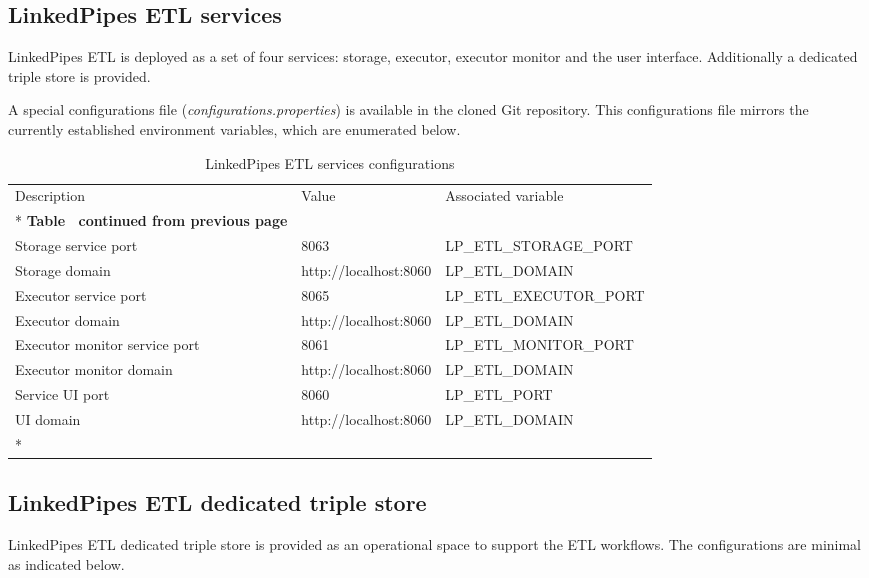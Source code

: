 	\subsection{LinkedPipes ETL services}
	
	LinkedPipes ETL is deployed as a set of four services: storage, executor, executor monitor and the user interface. Additionally a dedicated triple store is provided. 
	
	A special configurations file (\textit{configurations.properties}) is available in the cloned Git repository. This configurations file mirrors the currently established environment variables, which are enumerated below. 
	

	\begin{longtable}[c]{@{}p{5cm}p{4cm}l@{}}
		\toprule
		Description & Value & Associated variable \\* \midrule
		\endfirsthead
		\multicolumn{3}{c}%
		{{\bfseries Table \thetable\ continued from previous page}} \\
		\endhead
		\bottomrule
		\endfoot
		\endlastfoot
		Storage service port & 8063 & LP\_ETL\_STORAGE\_PORT \\
		Storage domain & http://localhost:8060 & LP\_ETL\_DOMAIN \\
		Executor service port & 8065 & LP\_ETL\_EXECUTOR\_PORT \\
		Executor domain & http://localhost:8060 & LP\_ETL\_DOMAIN \\
		Executor monitor service port & 8061 & LP\_ETL\_MONITOR\_PORT \\
		Executor monitor domain & http://localhost:8060 & LP\_ETL\_DOMAIN \\
		Service UI port & 8060 & LP\_ETL\_PORT \\
		UI domain & http://localhost:8060 & LP\_ETL\_DOMAIN \\* \bottomrule
		\caption{LinkedPipes ETL services configurations}
		\label{tab:my-table5}\\
	\end{longtable}
	
	\subsection{LinkedPipes ETL dedicated triple store}
	
	LinkedPipes ETL dedicated triple store is provided as an operational space to support the ETL workflows. The configurations are minimal as indicated below. 
	

